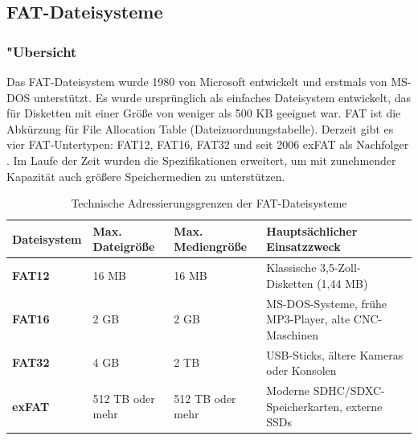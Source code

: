 \documentclass[11pt]{article}
\begin{document}
\subsection{FAT-Dateisysteme}
\subsubsection{"Ubersicht}
Das FAT-Dateisystem wurde 1980 von Microsoft entwickelt und erstmals von MS-DOS unterstützt.
Es wurde ursprünglich als einfaches Dateisystem entwickelt, 
das für Disketten mit einer Größe von weniger als 500 KB geeignet war. 
FAT ist die Abkürzung für File Allocation Table (Dateizuordnungstabelle). 
Derzeit gibt es vier FAT-Untertypen: FAT12, FAT16, FAT32 und seit 2006 exFAT als Nachfolger \cite{FAT32}.
Im Laufe der Zeit wurden die Spezifikationen erweitert, 
um mit zunehmender Kapazität auch größere Speichermedien zu unterstützen.

\begin{table}[H]
    \centering
    \caption{Technische Adressierungsgrenzen der FAT-Dateisysteme \cite{MSLearnFS}}
    \label{tab:fat_limits}
    \smallskip
    \begin{tabular}{l l l p{5cm}}
    \toprule
    \textbf{Dateisystem} & \textbf{Max. Dateigröße} & \textbf{Max. Mediengröße} & \textbf{Hauptsächlicher Einsatzzweck} \\
    \midrule
    \textbf{FAT12} & 16 MB & 16 MB   & Klassische 3,5-Zoll-Disketten (1,44 MB) \\
    \addlinespace
    \textbf{FAT16} & 2 GB & 2 GB  & MS-DOS-Systeme, frühe MP3-Player, alte CNC-Maschinen \\
    \addlinespace
    \textbf{FAT32} & 4 GB  & 2 TB  & USB-Sticks, ältere Kameras oder Konsolen \\
    \addlinespace
    \textbf{exFAT} & 512 TB oder mehr & 512 TB oder mehr & Moderne SDHC/SDXC-Speicherkarten, externe SSDs \\
    \bottomrule
    \end{tabular}
    \end{table}
\end{document}
